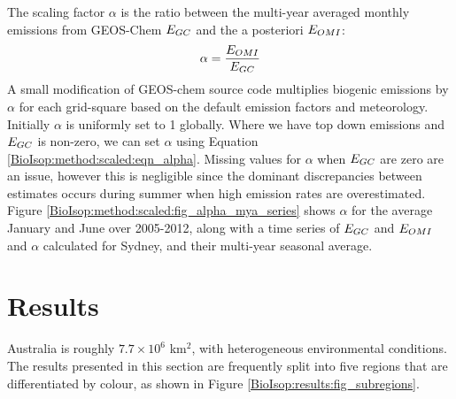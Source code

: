     The scaling factor $\alpha$ is the ratio between the multi-year averaged monthly emissions from GEOS-Chem $E_{GC}$ and the a posteriori $E_{OMI}$: 
    \begin{equation} \label{BioIsop:method:scaled:eqn_alpha}
        \alpha = \frac{E_{OMI}}{E_{GC}}
    \end{equation}
    A small modification of GEOS-chem source code multiplies biogenic emissions by $\alpha$ for each grid-square based on the default emission factors and meteorology.
    Initially $\alpha$ is uniformly set to 1 globally.
    Where we have top down emissions and $E_{GC}$ is non-zero, we can set $\alpha$ using Equation \ref{BioIsop:method:scaled:eqn_alpha}.
    Missing values for $\alpha$ when $E_{GC}$ are zero are an issue, however this is negligible since the dominant discrepancies between estimates occurs during summer when high emission rates are overestimated.
    Figure \ref{BioIsop:method:scaled:fig_alpha_mya_series} shows $\alpha$ for the average January and June over 2005-2012, along with a time series of $E_{GC}$ and $E_{OMI}$ and $\alpha$ calculated for Sydney, and their multi-year seasonal average.
    

\section{Results}
  \label{BioIsop:results}
  
  Australia is roughly $7.7 \times 10^6$ km$^{2}$, with heterogeneous environmental conditions.
  The results presented in this section are frequently split into five regions that are differentiated by colour, as shown in Figure \ref{BioIsop:results:fig_subregions}.
  
  

